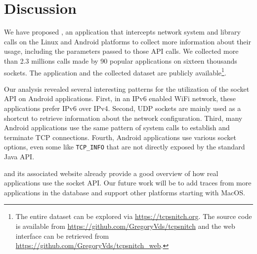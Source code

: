\section{Discussion}\label{sec:conclusion}

We have proposed \tcpsnitchns, an application that intercepts network
system and library calls on the Linux and Android platforms to
collect more information about their usage, including the parameters
passed to those API calls. We collected more than 2.3 millions calls made by
90 popular applications on sixteen thousands sockets. The application and the
collected dataset are publicly available\footnote{The entire dataset can be
explored via \url{https://tcpsnitch.org}. The \tcpsnitch source code is
available from \url{https://github.com/GregoryVds/tcpsnitch} and the web
interface can be retrieved from \url{https://github.com/GregoryVds/tcpsnitch_web}.
}.

Our analysis revealed several interesting patterns for the utilization
of the socket API on Android applications. First, in an IPv6 enabled
WiFi network, these applications prefer IPv6 over IPv4. Second, UDP sockets are
mainly used as a shortcut to retrieve information about the network
configuration. Third, many Android applications use the same pattern
of system calls to establish and terminate TCP connections. Fourth, Android
applications use various socket options, even some like
\texttt{TCP\_INFO} that are not directly exposed by the standard Java
API.

\tcpsnitch and its associated website already provide a good overview
of how real applications use the socket API. Our future work will be
to add traces from more applications in the database and support other
platforms starting with MacOS.
